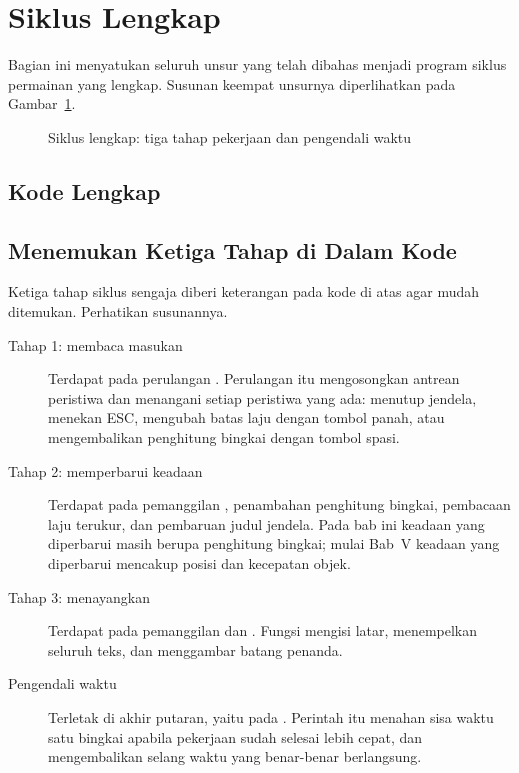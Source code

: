 \section{Siklus Lengkap}
\label{sec:siklus-lengkap}

Bagian ini menyatukan seluruh unsur yang telah dibahas menjadi program siklus
permainan yang lengkap. Susunan keempat unsurnya diperlihatkan pada
Gambar~\ref{fig:siklus-dengan-clock}.

\begin{figure}[htbp]
\centering

\caption{Siklus lengkap: tiga tahap pekerjaan dan pengendali waktu}
\label{fig:siklus-dengan-clock}
\end{figure}

\subsection{Kode Lengkap}


\subsection{Menemukan Ketiga Tahap di Dalam Kode}

Ketiga tahap siklus sengaja diberi keterangan pada kode di atas agar mudah
ditemukan. Perhatikan susunannya.

\begin{description}
  \item[Tahap 1: membaca masukan] Terdapat pada perulangan . Perulangan itu mengosongkan antrean peristiwa dan
        menangani setiap peristiwa yang ada: menutup jendela, menekan ESC,
        mengubah batas laju dengan tombol panah, atau mengembalikan penghitung
        bingkai dengan tombol spasi.
  \item[Tahap 2: memperbarui keadaan] Terdapat pada pemanggilan
        , penambahan penghitung bingkai, pembacaan laju
        terukur, dan pembaruan judul jendela. Pada bab ini keadaan yang
        diperbarui masih berupa penghitung bingkai; mulai Bab~V keadaan yang
        diperbarui mencakup posisi dan kecepatan objek.
  \item[Tahap 3: menayangkan] Terdapat pada pemanggilan 
        dan . Fungsi  mengisi
        latar, menempelkan seluruh teks, dan menggambar batang penanda.
  \item[Pengendali waktu] Terletak di akhir putaran, yaitu pada
        . Perintah itu menahan sisa waktu satu
        bingkai apabila pekerjaan sudah selesai lebih cepat, dan mengembalikan
        selang waktu yang benar-benar berlangsung.
\end{description}

